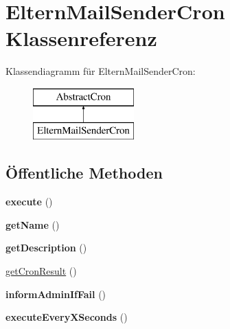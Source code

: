 \hypertarget{class_eltern_mail_sender_cron}{}\section{Eltern\+Mail\+Sender\+Cron Klassenreferenz}
\label{class_eltern_mail_sender_cron}
Klassendiagramm für Eltern\+Mail\+Sender\+Cron\+:\begin{figure}[H]
\begin{center}
\leavevmode
\includegraphics[height=2.000000cm]{class_eltern_mail_sender_cron}
\end{center}
\end{figure}
\subsection*{Öffentliche Methoden}
\begin{DoxyCompactItemize}
\item 
\mbox{\label{class_eltern_mail_sender_cron_a10c27a4270f5740d6d694dc1d1af6463}} 
{\bfseries execute} ()
\item 
\mbox{\label{class_eltern_mail_sender_cron_ae92690e3fbba447f0ba55a0b07c496b7}} 
{\bfseries get\+Name} ()
\item 
\mbox{\label{class_eltern_mail_sender_cron_aa3455f38c86d5107697ff834adff15b4}} 
{\bfseries get\+Description} ()
\item 
\mbox{\hyperlink{class_eltern_mail_sender_cron_a0462d511a20e053b568e4ccf58f0fe6d}{get\+Cron\+Result}} ()
\item 
\mbox{\label{class_eltern_mail_sender_cron_a8b9d3804b03e18be8b7505ac8e292b7b}} 
{\bfseries inform\+Admin\+If\+Fail} ()
\item 
\mbox{\label{class_eltern_mail_sender_cron_a0683c2ed9fe4099ebbb579eb2d1ae409}} 
{\bfseries execute\+Every\+X\+Seconds} ()
\end{DoxyCompactItemize}



